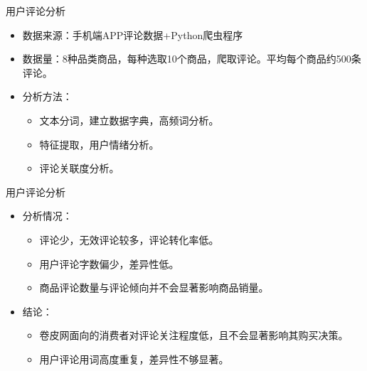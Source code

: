 \documentclass[10pt, aspectratio=32,handout]{beamer}
\begin{document}
\begin{frame}{用户评论分析}
  \begin{itemize}
    \item 数据来源：手机端APP评论数据+Python爬虫程序\newline
    \item 数据量：8种品类商品，每种选取10个商品，爬取评论。平均每个商品约500条评论。\newline
    \item 分析方法：\newline
    \begin{itemize}
    \item 文本分词，建立数据字典，高频词分析。\newline
    \item 特征提取，用户情绪分析。\newline
    \item 评论关联度分析。\newline
    \end{itemize}
  \end{itemize}
\end{frame}


\begin{frame}{用户评论分析}
\begin{itemize}
\item 分析情况：\newline
  \begin{itemize}
    \item 评论少，无效评论较多，评论转化率低。\newline
    \item 用户评论字数偏少，差异性低。\newline
    \item 商品评论数量与评论倾向并不会显著影响商品销量。\newline
  \end{itemize}
\item 结论：\newline
  \begin{itemize}
    \item 卷皮网面向的消费者对评论关注程度低，且不会显著影响其购买决策。\newline
    \item 用户评论用词高度重复，差异性不够显著。\newline
  \end{itemize}
\end{itemize}
\end{frame}
\end{document}
